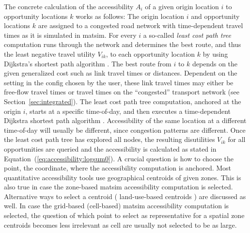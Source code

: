 The concrete calculation of the accessibility $A_i$ of a given origin location $i$ to opportunity locations $k$ 
works as follows: The origin location $i$ and opportunity locations $k$ are assigned to a congested road network 
with time-dependent travel times as it is simulated in \gls{matsim}. For every $i$ a so-called 
\emph{least cost path tree} computation runs through the network and determines the best route, and thus the 
least negative travel utility $V_{ik}$, to each opportunity location $k$ by using Dijkstra's shortest path 
algorithm \citep{Dijkstra1959ShortestPath}. The best route from $i$ to $k$ depends on the given generalized cost 
such as link travel times or distances. Dependent on the setting in the config chosen by the user, 
these link travel times may either be free-flow travel 
times or travel times on the ``congested'' transport network (see Section~\ref{sec:integrated}). The least cost 
path tree computation, anchored at the origin $i$, starts at a specific time-of-day, and then executes a 
time-dependent Dijkstra shortest path algorithm \citep{LefebvreBalmer2007Fastshortestpath}. Accessibility of the 
same location at a different time-of-day will usually be different, since congestion patterns are different.
Once the least cost path tree has explored all nodes, the resulting disutilities $V_{ik}$ for all opportunities 
are queried and the accessibility is calculated as stated in Equation~(\ref{eq:accessibility:logsum0}).
%
A crucial question is how to choose the point, \ie the coordinate, where the accessibility computation is anchored. 
Most quantitative accessibility tools use geographical centroids of given zones. This is also true in case the 
zone-based \gls{matsim} accessibility computation is selected. Alternative ways to select a centroid (\eg 
land-use-based centroids \citep{BuettnerEtAl2010Erreichbarkeitsatlas}) are discussed as well. In case the 
grid-based (cell-based) \gls{matsim} accessibility computation is selected, the question of which point to
select as representative for a spatial zone centroids becomes less irrelevant as cell are usually not
selected to be as large.


